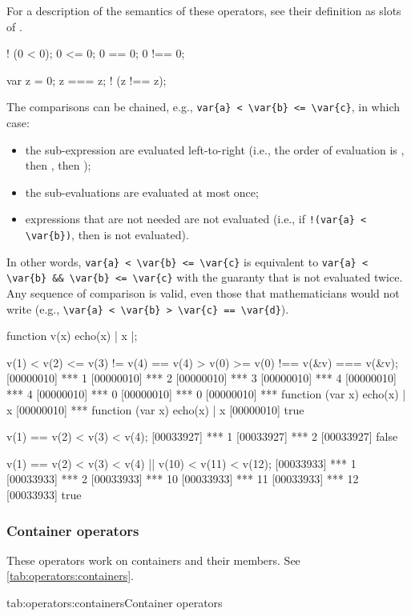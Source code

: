 For a description of the semantics of these operators, see their definition
as slots of .

\begin{urbiassert}
 ! (0 <  0);
    0 <= 0;
    0 == 0;
   0 !== 0;

var z = 0;
     z === z;
  ! (z !== z);
\end{urbiassert}

The comparisons can be chained, e.g.,
\lstinline|var{a} < \var{b} <= \var{c}|, in which case:
\begin{itemize}
\item the sub-expression are evaluated left-to-right (i.e., the order of
  evaluation is , then , then );
\item the sub-evaluations are evaluated at most once;
\item expressions that are not needed are not evaluated (i.e., if
  \lstinline|!(var{a} < \var{b})|, then  is not evaluated).
\end{itemize}

In other words, \lstinline|var{a} < \var{b} <= \var{c}| is equivalent to
\lstinline|var{a} < \var{b} && \var{b} <= \var{c}| with the guaranty that
 is not evaluated twice.  Any sequence of comparison is valid, even
those that mathematicians would not write (e.g.,
\lstinline|\var{a} < \var{b} > \var{c} == \var{d}|).

\begin{urbiscript}
function v(x) { echo(x) | x }|;

v(1) < v(2) <= v(3) != v(4) == v(4) > v(0) >= v(0) !== v(&v) === v(&v);
[00000010] *** 1
[00000010] *** 2
[00000010] *** 3
[00000010] *** 4
[00000010] *** 4
[00000010] *** 0
[00000010] *** 0
[00000010] *** function (var x) { echo(x) | x }
[00000010] *** function (var x) { echo(x) | x }
[00000010] true

v(1) == v(2) < v(3) < v(4);
[00033927] *** 1
[00033927] *** 2
[00033927] false

v(1) == v(2) < v(3) < v(4) || v(10) < v(11) < v(12);
[00033933] *** 1
[00033933] *** 2
[00033933] *** 10
[00033933] *** 11
[00033933] *** 12
[00033933] true
\end{urbiscript}

\subsubsection{Container operators}
\label{sec:lang:op:containers}

These operators work on containers and their members. See
\autoref{tab:operators:containers}.
\begin{operatorTable}{tab:operators:containers}{Container operators}
  \operatorsub\\\operatorsubass
  \\\hline
  \operatorin\\\operatornotin
\end{operatorTable}

